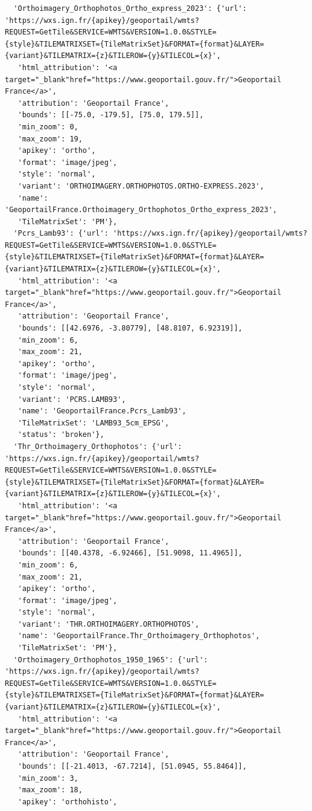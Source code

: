 \documentclass[
  letterpaper,
  DIV=11,
  numbers=noendperiod]{scrreprt}
\begin{document}
\begin{verbatim}
  'Orthoimagery_Orthophotos_Ortho_express_2023': {'url': 'https://wxs.ign.fr/{apikey}/geoportail/wmts?REQUEST=GetTile&SERVICE=WMTS&VERSION=1.0.0&STYLE={style}&TILEMATRIXSET={TileMatrixSet}&FORMAT={format}&LAYER={variant}&TILEMATRIX={z}&TILEROW={y}&TILECOL={x}',
   'html_attribution': '<a target="_blank"href="https://www.geoportail.gouv.fr/">Geoportail France</a>',
   'attribution': 'Geoportail France',
   'bounds': [[-75.0, -179.5], [75.0, 179.5]],
   'min_zoom': 0,
   'max_zoom': 19,
   'apikey': 'ortho',
   'format': 'image/jpeg',
   'style': 'normal',
   'variant': 'ORTHOIMAGERY.ORTHOPHOTOS.ORTHO-EXPRESS.2023',
   'name': 'GeoportailFrance.Orthoimagery_Orthophotos_Ortho_express_2023',
   'TileMatrixSet': 'PM'},
  'Pcrs_Lamb93': {'url': 'https://wxs.ign.fr/{apikey}/geoportail/wmts?REQUEST=GetTile&SERVICE=WMTS&VERSION=1.0.0&STYLE={style}&TILEMATRIXSET={TileMatrixSet}&FORMAT={format}&LAYER={variant}&TILEMATRIX={z}&TILEROW={y}&TILECOL={x}',
   'html_attribution': '<a target="_blank"href="https://www.geoportail.gouv.fr/">Geoportail France</a>',
   'attribution': 'Geoportail France',
   'bounds': [[42.6976, -3.80779], [48.8107, 6.92319]],
   'min_zoom': 6,
   'max_zoom': 21,
   'apikey': 'ortho',
   'format': 'image/jpeg',
   'style': 'normal',
   'variant': 'PCRS.LAMB93',
   'name': 'GeoportailFrance.Pcrs_Lamb93',
   'TileMatrixSet': 'LAMB93_5cm_EPSG',
   'status': 'broken'},
  'Thr_Orthoimagery_Orthophotos': {'url': 'https://wxs.ign.fr/{apikey}/geoportail/wmts?REQUEST=GetTile&SERVICE=WMTS&VERSION=1.0.0&STYLE={style}&TILEMATRIXSET={TileMatrixSet}&FORMAT={format}&LAYER={variant}&TILEMATRIX={z}&TILEROW={y}&TILECOL={x}',
   'html_attribution': '<a target="_blank"href="https://www.geoportail.gouv.fr/">Geoportail France</a>',
   'attribution': 'Geoportail France',
   'bounds': [[40.4378, -6.92466], [51.9098, 11.4965]],
   'min_zoom': 6,
   'max_zoom': 21,
   'apikey': 'ortho',
   'format': 'image/jpeg',
   'style': 'normal',
   'variant': 'THR.ORTHOIMAGERY.ORTHOPHOTOS',
   'name': 'GeoportailFrance.Thr_Orthoimagery_Orthophotos',
   'TileMatrixSet': 'PM'},
  'Orthoimagery_Orthophotos_1950_1965': {'url': 'https://wxs.ign.fr/{apikey}/geoportail/wmts?REQUEST=GetTile&SERVICE=WMTS&VERSION=1.0.0&STYLE={style}&TILEMATRIXSET={TileMatrixSet}&FORMAT={format}&LAYER={variant}&TILEMATRIX={z}&TILEROW={y}&TILECOL={x}',
   'html_attribution': '<a target="_blank"href="https://www.geoportail.gouv.fr/">Geoportail France</a>',
   'attribution': 'Geoportail France',
   'bounds': [[-21.4013, -67.7214], [51.0945, 55.8464]],
   'min_zoom': 3,
   'max_zoom': 18,
   'apikey': 'orthohisto',

\end{verbatim}
\end{document}

